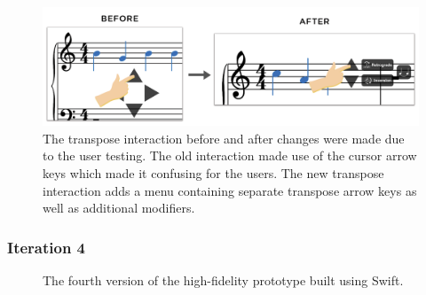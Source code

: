
				\begin{figure}[h]
					\centering
					\includegraphics[scale=0.32]{figures/before-after-transpose}
				    \caption{The transpose interaction before and after changes were made due to the user testing. The old interaction made use of the cursor arrow keys which made it confusing for the users. The new transpose interaction adds a menu containing separate transpose arrow keys as well as additional modifiers.}
				    \label{fig:before-after-transpose}
				\end{figure}

			\subsubsection{Iteration 4}

				\begin{figure}[H]
					\centering
				    \caption{The fourth version of the high-fidelity prototype built using Swift.}
				    \label{fig:flow_it4}
				\end{figure} 

